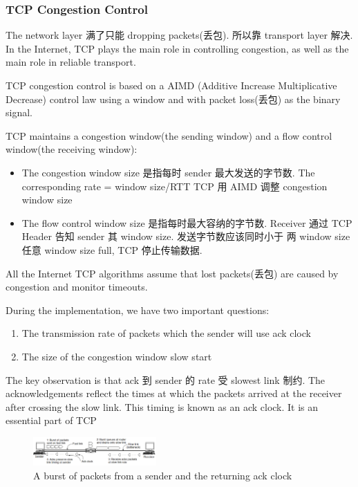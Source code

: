 \subsubsection{TCP Congestion Control}
The network layer 满了只能 dropping packets(丢包). 所以靠 transport layer 解决. In the Internet, TCP plays the main role in controlling congestion, as well as the main role in reliable transport. 

TCP congestion control is based on a AIMD (Additive
Increase Multiplicative Decrease) control law using a
window and with packet loss(丢包) as the binary signal.

TCP maintains a congestion window(the sending window) and a flow control window(the receiving window):
\begin{itemize}
    \item The congestion window size 是指每时 sender 最大发送的字节数. 
    \subitem The corresponding rate = window size/RTT
    \subitem TCP 用 AIMD 调整 congestion window size
    \item The flow control window size 是指每时最大容纳的字节数. Receiver 通过 TCP Header 告知 sender 其 window size. 
    \subitem 发送字节数应该同时小于 两 window size
    \subitem 任意 window size full, TCP 停止传输数据. 
\end{itemize}

All the Internet TCP algorithms assume that lost packets(丢包) are caused by congestion and monitor timeouts. 

During the implementation, we have two important questions:
\begin{enumerate}\scriptsize
    \item The transmission rate of packets which the sender will use
    \subitem ack clock
    \item The size of the congestion window
    \subitem slow start
\end{enumerate}

The key observation is that ack 到 sender 的 rate 受 slowest link 制约.
The acknowledgements reflect the times at which the packets arrived at
the receiver after crossing the slow link.
This timing is known as an ack clock. It is an essential part of TCP

\begin{figure}[!htb]
    \centering
    \includegraphics[width=0.42\textwidth]{pic/CN6/A burst of packets from a sender and the returning ack clock}
    \caption{A burst of packets from a sender and the returning ack clock}
\end{figure}

